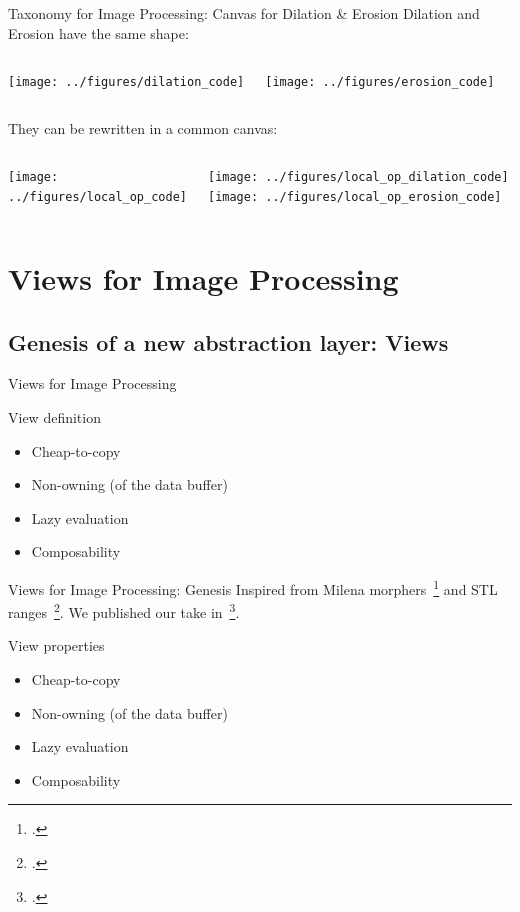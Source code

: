 \documentclass[12pt,aspectratio=169]{beamer}
\begin{document}
\begin{frame}[fragile]{Taxonomy for Image Processing: Canvas for Dilation \& Erosion}
  Dilation and Erosion have the same shape:
  \begin{columns}[T,onlytextwidth]
    \texttt{[image: ../figures/dilation\_code]}

    \texttt{[image: ../figures/erosion\_code]}
  \end{columns}
  \bigskip
  They can be rewritten in a common canvas:
  \begin{columns}[T,onlytextwidth]
    \texttt{[image: ../figures/local\_op\_code]}

    \texttt{[image: ../figures/local\_op\_dilation\_code]}
    \texttt{[image: ../figures/local\_op\_erosion\_code]}
  \end{columns}
\end{frame}

%
%
%
\section[Views for Image Processing]{Views for Image Processing}

\subsection{Genesis of a new abstraction layer: Views}

\begin{frame}[fragile]{Views for Image Processing}
  \begin{alertblock}{View definition}
    \begin{itemize}
      \item Cheap-to-copy
      \item Non-owning (of the data buffer)
      \item Lazy evaluation
      \item Composability
    \end{itemize}
  \end{alertblock}
\end{frame}

\begin{frame}[fragile]{Views for Image Processing: Genesis}
  Inspired from Milena morphers~\footcite{levillain.2009.ismm} and STL ranges~\footcite{niebler.2014.ranges}.
  We published our take in~\footcite[]{roynard.2022.gpce}.
  \begin{alertblock}{View properties}
    \begin{itemize}
      \item Cheap-to-copy
      \item Non-owning (of the data buffer)
      \item Lazy evaluation
      \item Composability
    \end{itemize}
  \end{alertblock}
\end{frame}
\end{document}
